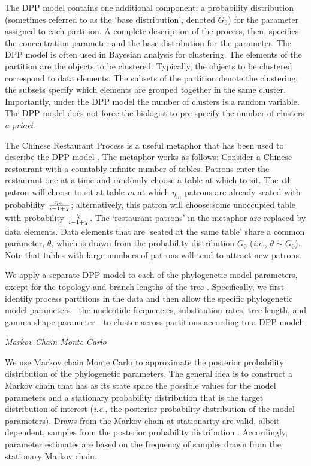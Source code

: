 \documentclass[11pt]{article}
\begin{document}
The DPP model contains one additional component: a probability distribution (sometimes referred to as the `base distribution', denoted $G_0$) for the parameter assigned to each partition.
A complete description of the process, then, specifies the concentration parameter and the base distribution for the parameter.
The DPP model is often used in Bayesian analysis for clustering.
The elements of the partition are the objects to be clustered.
Typically, the objects to be clustered correspond to data elements.
The subsets of the partition denote the clustering; the subsets specify which elements are grouped together in the same cluster.
Importantly, under the DPP model the number of clusters is a random variable.
The DPP model does not force the biologist to pre-specify the number of clusters {\it a priori}.

The Chinese Restaurant Process is a useful metaphor that has been used to describe the DPP model \citep{aldous85}.
The metaphor works as follows: Consider a Chinese restaurant with a countably infinite number of tables.
Patrons enter the restaurant one at a time and randomly choose a table at which to sit.
The $i$th patron will choose to sit at table $m$ at which $\eta_m$ patrons are already seated with probability ${\eta_m \over i-1+ \chi}$; alternatively, this patron will choose some unoccupied table with probability ${\chi \over i-1+ \chi}$.
The `restaurant patrons' in the metaphor are replaced by data elements.
Data elements that are `seated at the same table' share a common parameter, $\theta$, which is drawn from the probability distribution $G_0$ ({\it i.e.}, $\theta \sim G_0$).
Note that tables with large numbers of patrons will tend to attract new patrons.

We apply a separate DPP model to each of the phylogenetic model parameters, except for the topology and branch lengths of the tree \citep[however, see][]{ane07}.
Specifically, we first identify process partitions in the data and then allow the specific phylogenetic model parameters---the nucleotide frequencies, substitution rates, tree length, and gamma shape parameter---to cluster across partitions according to a DPP model.

\bigskip

\begin{center}
{\it Markov Chain Monte Carlo}
\end{center}

We use Markov chain Monte Carlo \citep[MCMC;][]{metropolis53,hastings70} to approximate the posterior probability distribution of the phylogenetic parameters.
The general idea is to construct a Markov chain that has as its state space the possible values for the model parameters and a stationary probability distribution that is the target distribution of interest ({\it i.e.}, the posterior probability distribution of the model parameters).
Draws from the Markov chain at stationarity are valid, albeit dependent, samples from the posterior probability distribution \citep{tierney94}.
Accordingly, parameter estimates are based on the frequency of samples drawn from the stationary Markov chain.
\end{document}
